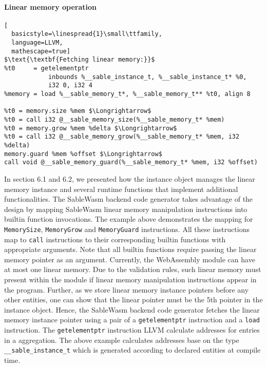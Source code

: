 \paragraph{Linear memory operation} \quad
\begin{lstlisting}[
  basicstyle=\linespread{1}\small\ttfamily, 
  language=LLVM, 
  mathescape=true]
$\text{\textbf{Fetching linear memory:}}$
%t0     = getelementptr 
            inbounds %__sable_instance_t, %__sable_instance_t* %0, 
            i32 0, i32 4
%memory = load %__sable_memory_t*, %__sable_memory_t** %t0, align 8

%t0 = memory.size %mem $\Longrightarrow$
%t0 = call i32 @__sable_memory_size(%__sable_memory_t* %mem)
%t0 = memory.grow %mem %delta $\Longrightarrow$
%t0 = call i32 @__sable_memory_grow(%__sable_memory_t* %mem, i32 %delta)
memory.guard %mem %offset $\Longrightarrow$
call void @__sable_memory_guard(%__sable_memory_t* %mem, i32 %offset)
\end{lstlisting}
In section 6.1 and 6.2, we presented how the instance object manages the linear
memory instance and several runtime functions that implement additional
functionalities. The SableWasm backend code generator takes advantage of the
design by mapping SableWasm linear memory manipulation instructions into builtin
function invocations. The example above demonstrates the mapping for
\texttt{MemorySize}, \texttt{MemoryGrow} and \texttt{MemoryGuard} instructions.
All these instructions map to \texttt{call} instructions to their corresponding
builtin functions with appropriate arguments. Note that all builtin functions
require passing the linear memory pointer as an argument. Currently, the
WebAssembly module can have at most one linear memory. Due to the validation
rules, such linear memory must present within the module if linear memory
manipulation instructions appear in the program. Further, as we store linear
memory instance pointers before any other entities, one can show that the
linear pointer must be the 5th pointer in the instance object. Hence, the
SableWasm backend code generator fetches the linear memory instance pointer
using a pair of a \texttt{getelementptr} instruction and a \texttt{load}
instruction. The \texttt{getelementptr} instruction LLVM calculate addresses
for entries in a aggregation. The above example calculates addresses base on
the type \texttt{\_\_sable\_instance\_t} which is generated according to
declared entities at compile time.

